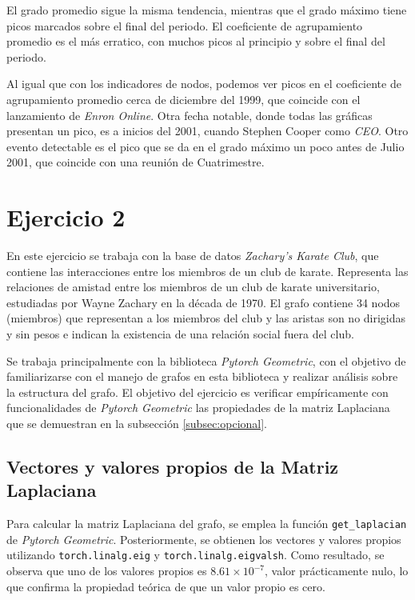 \documentclass{article}
\begin{document}
El grado promedio sigue la misma tendencia, mientras que el grado máximo tiene picos marcados sobre el final del periodo. El coeficiente de agrupamiento promedio es el más erratico, con muchos picos al principio y sobre el final del periodo.

Al igual que con los indicadores de nodos, podemos ver picos en el coeficiente de agrupamiento promedio cerca de diciembre del 1999, que coincide con el lanzamiento de \emph{Enron Online}. Otra fecha notable, donde todas las gráficas presentan un pico, es a inicios del 2001, cuando Stephen Cooper como \emph{CEO}. Otro evento detectable es el pico que se da en el grado máximo un poco antes de Julio 2001, que coincide con una reunión de Cuatrimestre.

\section{Ejercicio 2} \label{sec: ej2}
En este ejercicio se trabaja con la base de datos \textit{Zachary's Karate Club}, que contiene las interacciones entre los miembros de un club de karate. Representa las relaciones de amistad entre los miembros de un club de karate universitario, estudiadas por Wayne Zachary en la década de 1970. El grafo contiene 34 nodos (miembros) que representan a los miembros del club y las aristas son no dirigidas y sin pesos e indican la existencia de una relación social fuera del club.

Se trabaja principalmente con la biblioteca \textit{Pytorch Geometric}, con el objetivo de familiarizarse con el manejo de grafos en esta biblioteca y realizar análisis sobre la estructura del grafo. El objetivo del ejercicio es verificar empíricamente con funcionalidades de \textit{Pytorch Geometric} las propiedades de la matriz Laplaciana que se demuestran en la subsección \ref{subsec:opcional}.

\subsection{Vectores y valores propios de la Matriz Laplaciana}
Para calcular la matriz Laplaciana del grafo, se emplea la función \verb|get_laplacian| de \textit{Pytorch Geometric}. Posteriormente, se obtienen los vectores y valores propios utilizando \verb|torch.linalg.eig| y \verb|torch.linalg.eigvalsh|. Como resultado, se observa que uno de los valores propios es $8.61 \times 10^{-7}$, valor prácticamente nulo, lo que confirma la propiedad teórica de que un valor propio es cero.
\end{document}
